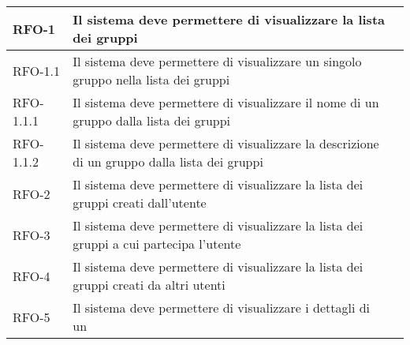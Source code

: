 \begin{center}
{\begin{longtable}{
      |>{\centering\arraybackslash}p{60pt}
      |>{\centering\arraybackslash}p{220pt}
      |>{\centering\arraybackslash}p{60pt}|}
      RFO-1                                                                & Il
      sistema deve permettere di visualizzare la lista dei
      gruppi                                                               &
      \nameref{uc:scenario-visualizzazione-lista-gruppi}                        \\
      \hline
      RFO-1.1                                                              & Il
      sistema deve permettere di visualizzare un singolo
      gruppo nella lista dei gruppi                                        &
      \nameref{sub:visualizzazione-singolo-gruppo}                              \\
      \hline
      RFO-1.1.1                                                            & Il
      sistema deve permettere di visualizzare il nome di un
      gruppo dalla lista dei gruppi                                        &
      \nameref{subsub:visualizzazione-nome-gruppo}                              \\
      \hline
      RFO-1.1.2                                                            & Il
      sistema deve permettere di visualizzare la descrizione
      di un gruppo dalla lista dei gruppi                                  &
      \nameref{subsub:visualizzazione-descrizione-gruppo}
      \\
      \hline
      RFO-2                                                                & Il
      sistema deve permettere di visualizzare la lista dei
      gruppi creati dall'utente                                            &
      \nameref{uc:scenario-visualizzazione-lista-gruppi-creati}
      \\
      \hline
      RFO-3                                                                & Il
      sistema deve permettere di visualizzare la lista dei
      gruppi	a cui partecipa l'utente
                                                                           &
      \nameref{uc:scenario-visualizzazione-lista-gruppi-partecipa}
      \\
      \hline
      RFO-4                                                                & Il
      sistema deve permettere di visualizzare la lista dei
      gruppi creati da altri utenti                                        &
      \nameref{uc:scenario-visualizzazione-lista-gruppi-altri}
      \\
      \hline
      RFO-5                                                                & Il
      sistema deve permettere di visualizzare i dettagli di un

\end{longtable}}
\end{center}
